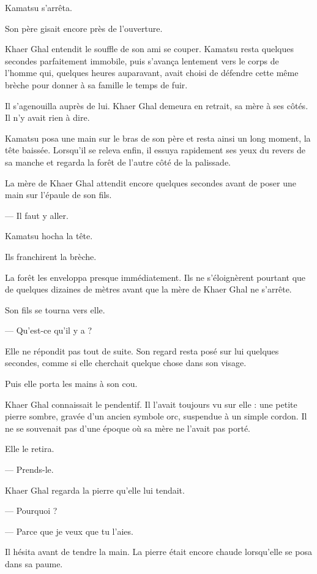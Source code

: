 Kamatsu s'arrêta.

Son père gisait encore près de l'ouverture.

Khaer Ghal entendit le souffle de son ami se couper. Kamatsu resta quelques
secondes parfaitement immobile, puis s'avança lentement vers le corps de
l'homme qui, quelques heures auparavant, avait choisi de défendre cette même
brèche pour donner à sa famille le temps de fuir.

Il s'agenouilla auprès de lui. Khaer Ghal demeura en retrait, sa mère à ses
côtés. Il n'y avait rien à dire.

Kamatsu posa une main sur le bras de son père et resta ainsi un long moment, la
tête baissée. Lorsqu'il se releva enfin, il essuya rapidement ses yeux du revers
de sa manche et regarda la forêt de l'autre côté de la palissade.

La mère de Khaer Ghal attendit encore quelques secondes avant de poser une main
sur l'épaule de son fils.

— Il faut y aller.

Kamatsu hocha la tête.

Ils franchirent la brèche.

\scenebreak

La forêt les enveloppa presque immédiatement. Ils ne s'éloignèrent pourtant que
de quelques dizaines de mètres avant que la mère de Khaer Ghal ne s'arrête.

Son fils se tourna vers elle.

— Qu'est-ce qu'il y a ?

Elle ne répondit pas tout de suite. Son regard resta posé sur lui quelques
secondes, comme si elle cherchait quelque chose dans son visage.

Puis elle porta les mains à son cou.

Khaer Ghal connaissait le pendentif. Il l'avait toujours vu sur elle : une
petite pierre sombre, gravée d'un ancien symbole orc, suspendue à un simple
cordon. Il ne se souvenait pas d'une époque où sa mère ne l'avait pas porté.

Elle le retira.

— Prends-le.

Khaer Ghal regarda la pierre qu'elle lui tendait.

— Pourquoi ?

— Parce que je veux que tu l'aies.

Il hésita avant de tendre la main. La pierre était encore chaude lorsqu'elle
se posa dans sa paume.

